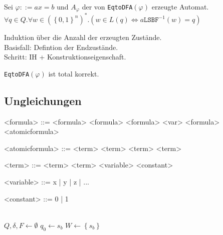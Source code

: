 \begin{frame}
  \begin{Lemma}
    Sei $\varphi ::= ax=b$ und $A_\varphi$ der von \texttt{EqtoDFA}$(\varphi)$ erzeugte Automat.\\
    $\forall q \in Q. \forall w \in \left(\left\{0,1\right\}^n\right)^*.\left(w \in L(q) \iff a\texttt{LSBF}^{-1}(w) = q\right)$
  \end{Lemma}
  \begin{Beweis}
    Induktion über die Anzahl der erzeugten Zustände.\\
    Basisfall: Defintion der Endzustände.\\
    Schritt: IH + Konstruktionseigenschaft.
  \end{Beweis}
  \begin{Korollar}
    \texttt{EqtoDFA}$(\varphi)$ ist total korrekt.
  \end{Korollar}
\end{frame}

\subsection{Ungleichungen}
\begin{frame}[fragile]
  \begin{grammar}
    <formula> ::= \lit{$\neg$} <formula> \alt <formula> \lit{$\lor$} <formula> \alt \lit{$\exists$} <var> <formula> \alt <atomicformula>

    <atomicformula> ::= <term> \lit{$=$} <term> \alt <term> \lit{$\leq$} <term>

    <term> ::= <term> \lit{$+$} <term> \alt <variable> \alt <constant>

    <variable> ::= x | y | z | ...

    <constant> ::= 0 | 1
  \end{grammar}
\end{frame}

\begin{frame}
\begin{algorithm}[H]
  \IqtoDFA{$\varphi$}\\
  $Q, \delta, F \leftarrow \emptyset$\;
  $q_0 \leftarrow s_b$\;
  $W \leftarrow \left\{s_b\right\}$\;
\end{algorithm}
\end{frame}
